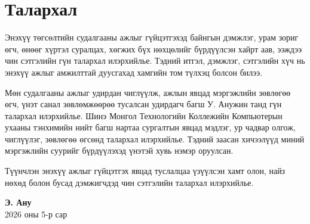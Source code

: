 
\chapter*{Талархал}

Энэхүү төгсөлтийн судалгааны ажлыг гүйцэтгэхэд байнгын дэмжлэг, урам зориг өгч, өнөөг хүртэл суралцах, хөгжих бүх нөхцөлийг бүрдүүлсэн хайрт аав, ээждээ чин сэтгэлийн гүн талархал илэрхийлье. Тэдний итгэл, дэмжлэг, сэтгэлийн хүч нь энэхүү ажлыг амжилттай дуусгахад хамгийн том түлхэц болсон билээ.

Мөн судалгааны ажлыг удирдан чиглүүлж, ажлын явцад мэргэжлийн зөвлөгөө өгч, үнэт санал зөвлөмжөөрөө тусалсан удирдагч багш У. Анужин танд гүн талархал илэрхийлье. Шинэ Монгол Технологийн Коллежийн Компьютерын ухааны тэнхимийн нийт багш нартаа сургалтын явцад мэдлэг, ур чадвар олгож, чиглүүлэг, зөвлөгөө өгсөнд талархал илэрхийлье. Тэдний заасан хичээлүүд миний мэргэжлийн суурийг бүрдүүлэхэд үнэтэй хувь нэмэр оруулсан. 

Түүнчлэн энэхүү ажлыг гүйцэтгэх явцад туслалцаа үзүүлсэн хамт олон, найз нөхөд болон бусад дэмжигчдэд чин сэтгэлийн талархал илэрхийлье.

\vspace{10mm}
\begin{flushright}
\textbf{Э. Ану}\\
2026 оны 5-р сар
\end{flushright}

